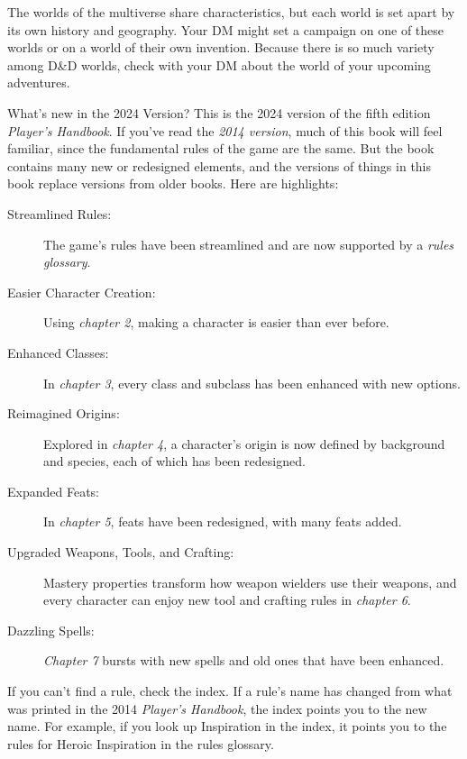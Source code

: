 \documentclass[10pt,a4paper,twoside,bg=print,twocolumn,openany,nodeprecatedcode]{dndbook}
\begin{document}
The worlds of the multiverse share characteristics, but each world is set apart by its own history and geography. Your DM might set a campaign on one of these worlds or on a world of their own invention. Because there is so much variety among D\&D worlds, check with your DM about the world of your upcoming adventures.

\begin{DndSidebar}[float=!b]{What's new in the 2024 Version?}
This is the 2024 version of the fifth edition \textit{Player's Handbook}. If you've read the \textit{2014 version}, much of this book will feel familiar, since the fundamental rules of the game are the same. But the book contains many new or redesigned elements, and the versions of things in this book replace versions from older books. Here are highlights:




\begin{description}
\item[Streamlined Rules:]
The game's rules have been streamlined and are now supported by a \textit{rules glossary}.
\item[Easier Character Creation:]
Using \textit{chapter 2}, making a character is easier than ever before.
\item[Enhanced Classes:]
In \textit{chapter 3}, every class and subclass has been enhanced with new options.
\item[Reimagined Origins:]
Explored in \textit{chapter 4}, a character's origin is now defined by background and species, each of which has been redesigned.
\item[Expanded Feats:]
In \textit{chapter 5}, feats have been redesigned, with many feats added.
\item[Upgraded Weapons, Tools, and Crafting:]
Mastery properties transform how weapon wielders use their weapons, and every character can enjoy new tool and crafting rules in \textit{chapter 6}.
\item[Dazzling Spells:]
\textit{Chapter 7} bursts with new spells and old ones that have been enhanced.
\end{description}



If you can't find a rule, check the index. If a rule's name has changed from what was printed in the 2014 \textit{Player's Handbook}, the index points you to the new name. For example, if you look up Inspiration in the index, it points you to the rules for Heroic Inspiration in the rules glossary.



\end{DndSidebar}
\end{document}

